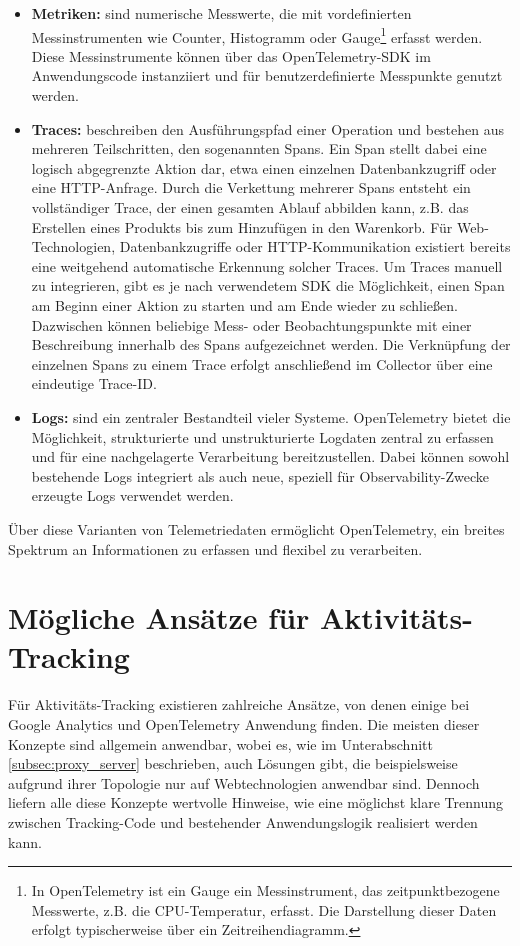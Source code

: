 \begin{itemize}
\item \textbf{Metriken:} sind numerische Messwerte, die mit vordefinierten Messinstrumenten wie Counter, Histogramm oder Gauge\footnote{In OpenTelemetry ist ein Gauge ein Messinstrument, das zeitpunktbezogene Messwerte, z.B. die CPU-Temperatur, erfasst. Die Darstellung dieser Daten erfolgt typischerweise über ein Zeitreihendiagramm.} erfasst werden. Diese Messinstrumente können über das OpenTelemetry-SDK im Anwendungscode instanziiert und für benutzerdefinierte Messpunkte genutzt werden.

\item \textbf{Traces:} beschreiben den Ausführungspfad einer Operation und bestehen aus mehreren Teilschritten, den sogenannten Spans. Ein Span stellt dabei eine logisch abgegrenzte Aktion dar, etwa einen einzelnen Datenbankzugriff oder eine HTTP-Anfrage. Durch die Verkettung mehrerer Spans entsteht ein vollständiger Trace, der einen gesamten Ablauf abbilden kann, z.B. das Erstellen eines Produkts bis zum Hinzufügen in den Warenkorb.  
Für Web-Technologien, Datenbankzugriffe oder HTTP-Kommunikation existiert bereits eine weitgehend automatische Erkennung solcher Traces. Um Traces manuell zu integrieren, gibt es je nach verwendetem SDK die Möglichkeit, einen Span am Beginn einer Aktion zu starten und am Ende wieder zu schließen. Dazwischen können beliebige Mess- oder Beobachtungspunkte mit einer Beschreibung innerhalb des Spans aufgezeichnet werden. Die Verknüpfung der einzelnen Spans zu einem Trace erfolgt anschließend im Collector über eine eindeutige Trace-ID.

\item \textbf{Logs:} sind ein zentraler Bestandteil vieler Systeme. OpenTelemetry bietet die Möglichkeit, strukturierte und unstrukturierte Logdaten zentral zu erfassen und für eine nachgelagerte Verarbeitung bereitzustellen. Dabei können sowohl bestehende Logs integriert als auch neue, speziell für Observability-Zwecke erzeugte Logs verwendet werden.
\end{itemize}

Über diese Varianten von Telemetriedaten ermöglicht OpenTelemetry, ein breites Spektrum an Informationen zu erfassen und flexibel zu verarbeiten\cite{opentelemetry_what_is}.

\section{Mögliche Ansätze für Aktivitäts-Tracking}
\label{sec:solutions_tracking}
Für Aktivitäts-Tracking existieren zahlreiche Ansätze, von denen einige bei Google Analytics und OpenTelemetry Anwendung finden. Die meisten dieser Konzepte sind allgemein anwendbar, wobei es, wie im Unterabschnitt \ref{subsec:proxy_server} beschrieben, auch Lösungen gibt, die beispielsweise aufgrund ihrer Topologie nur auf Webtechnologien anwendbar sind. Dennoch liefern alle diese Konzepte wertvolle Hinweise, wie eine möglichst klare Trennung zwischen Tracking-Code und bestehender Anwendungslogik realisiert werden kann.

